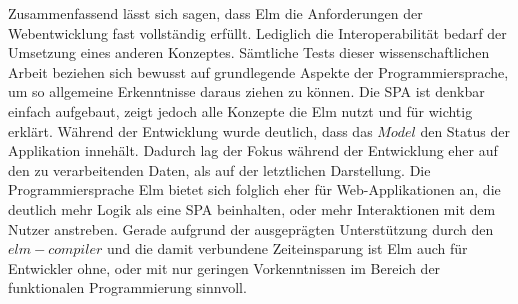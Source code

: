 Zusammenfassend lässt sich sagen, dass Elm die Anforderungen der Webentwicklung fast vollständig erfüllt. Lediglich die Interoperabilität bedarf der Umsetzung eines anderen Konzeptes.
Sämtliche Tests dieser wissenschaftlichen Arbeit beziehen sich bewusst auf grundlegende Aspekte der Programmiersprache, um so allgemeine Erkenntnisse daraus ziehen zu können. Die \ac{SPA} ist denkbar einfach aufgebaut, zeigt jedoch alle Konzepte die Elm nutzt und für wichtig erklärt. Während der Entwicklung wurde deutlich, dass das $Model$ den Status der Applikation innehält. Dadurch lag der Fokus während der Entwicklung eher auf den zu verarbeitenden Daten, als auf der letztlichen Darstellung. Die Programmiersprache Elm bietet sich folglich eher für Web-Applikationen an, die deutlich mehr Logik als eine \ac{SPA} beinhalten, oder mehr Interaktionen mit dem Nutzer anstreben. Gerade aufgrund der ausgeprägten Unterstützung durch den $elm-compiler$ und die damit verbundene Zeiteinsparung ist Elm auch für Entwickler ohne, oder mit nur geringen Vorkenntnissen im Bereich der funktionalen Programmierung sinnvoll.
